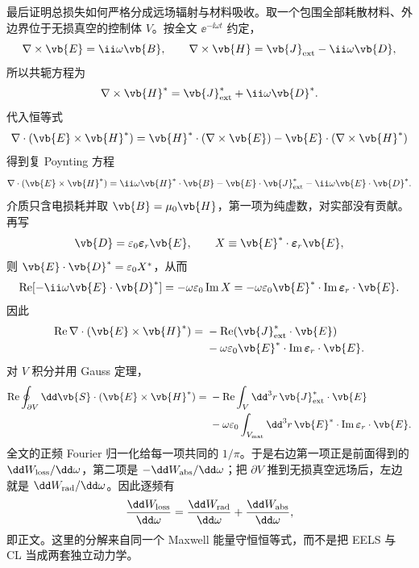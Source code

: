 \begin{derivation}
最后证明总损失如何严格分成远场辐射与材料吸收。取一个包围全部耗散材料、外边界位于无损真空的控制体 $V$。按全文 $\ee^{-\ii\omega t}$ 约定，
\begin{equation*}
 \nabla\times\vb{E}=\ii\omega\vb{B},
 \qquad
 \nabla\times\vb{H}=\vb{J}_{\rm ext}-\ii\omega\vb{D},
\end{equation*}
所以共轭方程为
\begin{equation*}
 \nabla\times\vb{H}^*=\vb{J}_{\rm ext}^*+\ii\omega\vb{D}^*.
\end{equation*}
代入恒等式
\begin{equation*}
 \nabla\cdot(\vb{E}\times\vb{H}^*)
 =\vb{H}^*\cdot(\nabla\times\vb{E})
 -\vb{E}\cdot(\nabla\times\vb{H}^*)
\end{equation*}
得到复 Poynting 方程
\begin{equation*}
 \nabla\cdot(\vb{E}\times\vb{H}^*)
 =\ii\omega\vb{H}^*\cdot\vb{B}
 -\vb{E}\cdot\vb{J}_{\rm ext}^*
 -\ii\omega\vb{E}\cdot\vb{D}^*.
\end{equation*}
介质只含电损耗并取 $\vb{B}=\mu_0\vb{H}$，第一项为纯虚数，对实部没有贡献。再写
\begin{equation*}
 \vb{D}=\varepsilon_0\boldsymbol\varepsilon_r\vb{E},
 \qquad
 X\equiv\vb{E}^*\cdot\boldsymbol\varepsilon_r\vb{E},
\end{equation*}
则 $\vb{E}\cdot\vb{D}^*=\varepsilon_0X^*$，从而
\begin{equation*}
 \operatorname{Re}[-\ii\omega\vb{E}\cdot\vb{D}^*]
 =-\omega\varepsilon_0\operatorname{Im}X
 =-\omega\varepsilon_0
 \vb{E}^*\cdot\operatorname{Im}\boldsymbol\varepsilon_r\cdot\vb{E}.
\end{equation*}
因此
\begin{align*}
 \operatorname{Re}\nabla\cdot(\vb{E}\times\vb{H}^*)
 ={}&-\operatorname{Re}(\vb{J}_{\rm ext}^*\cdot\vb{E})\\
 &-\omega\varepsilon_0
 \vb{E}^*\cdot\operatorname{Im}\boldsymbol\varepsilon_r\cdot\vb{E}.
\end{align*}
对 $V$ 积分并用 Gauss 定理，
\begin{align*}
 \operatorname{Re}\oint_{\partial V}\dd\vb{S}\cdot
 (\vb{E}\times\vb{H}^*)
 ={}&-\operatorname{Re}\int_V\dd^3r\,
 \vb{J}_{\rm ext}^*\cdot\vb{E}\\
 &-\omega\varepsilon_0\int_{V_{\rm mat}}\dd^3r\,
 \vb{E}^*\cdot\operatorname{Im}\boldsymbol\varepsilon_r\cdot\vb{E}.
\end{align*}
全文的正频 Fourier 归一化给每一项共同的 $1/\pi$。于是右边第一项正是前面得到的 $\dd W_{\rm loss}/\dd\omega$，第二项是 $-\dd W_{\rm abs}/\dd\omega$；把 $\partial V$ 推到无损真空远场后，左边就是 $\dd W_{\rm rad}/\dd\omega$。因此逐频有
\begin{equation*}
 \frac{\dd W_{\rm loss}}{\dd\omega}
 =\frac{\dd W_{\rm rad}}{\dd\omega}
 +\frac{\dd W_{\rm abs}}{\dd\omega},
\end{equation*}
即正文。这里的分解来自同一个 Maxwell 能量守恒恒等式，而不是把 EELS 与 CL 当成两套独立动力学。
\end{derivation}

